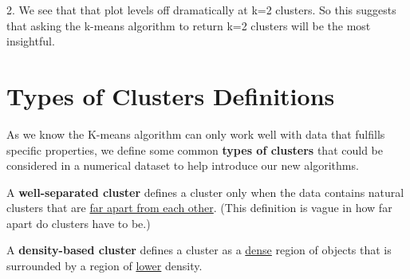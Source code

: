 \documentclass[11pt]{elegantbook}
\begin{document}
2. We see that that plot levels off dramatically at k=2 clusters. So this suggests that asking the k-means algorithm to return k=2 clusters will be the most insightful.

\section{Types of Clusters Definitions}
As we know the K-means algorithm can only work well with data that fulfills specific properties, we define some common \textbf{types of clusters} that could be considered in a numerical dataset to help introduce our new algorithms.

\begin{definition}
    A \textbf{well-separated cluster} defines a cluster only when the data contains natural clusters that are \underline{far apart from each other}. (This definition is vague in how far apart do clusters have to be.)
\end{definition}
\begin{definition}
    A \textbf{density-based cluster} defines a cluster as a \underline{dense} region of objects that is surrounded by a region of \underline{lower} density.
\end{definition}
\end{document}
